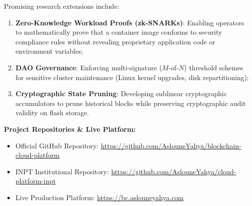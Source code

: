 \documentclass[a4paper,12pt]{article}
\begin{document}
Promising research extensions include:
\begin{enumerate}[leftmargin=1.2cm]
    \item \textbf{Zero-Knowledge Workload Proofs (zk-SNARKs)}: Enabling operators to mathematically prove that a container image conforms to security compliance rules without revealing proprietary application code or environment variables;
    \item \textbf{DAO Governance}: Enforcing multi-signature ($M$-of-$N$) threshold schemes for sensitive cluster maintenance (Linux kernel upgrades, disk repartitioning);
    \item \textbf{Cryptographic State Pruning}: Developing sublinear cryptographic accumulators to prune historical blocks while preserving cryptographic audit validity on flash storage.
\end{enumerate}

\vspace{0.8cm}
\noindent\textbf{Project Repositories \& Live Platform:}
\begin{itemize}
    \item Official GitHub Repository: \url{https://github.com/AslouneYahya/blockchain-cloud-platform}
    \item INPT Institutional Repository: \url{https://github.com/AslouneYahya/cloud-platform-inpt}
    \item Live Production Platform: \url{https://bc.aslouneyahya.com}
\end{itemize}
\end{document}
